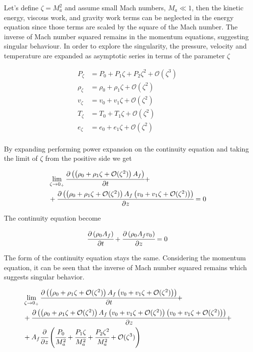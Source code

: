 \documentclass[../Article_Model_Parameters.tex]{subfiles}
\begin{document}
	Let's define $\zeta=M_a^2$ and assume small Mach numbers, $M_a \ll 1$, then the kinetic energy, viscous work, and gravity work terms can be neglected in the energy equation since those terms are scaled by the square of the Mach number. The inverse of Mach number squared remains in the momentum equations, suggesting singular behaviour. In order to explore the singularity, the pressure, velocity and temperature are expanded as asymptotic series in terms of the parameter $\zeta$
	
	{\footnotesize
		\begin{align*}
			P_\zeta 	& = P_0 	+ P_1 \zeta		+ P_2 \zeta^2 		+ \mathcal{O}(\zeta^3) \\
			\rho_\zeta 	& = \rho_0	+ \rho_1 \zeta	+ \mathcal{O}(\zeta^2) \\
			v_\zeta 	& = v_0		+ v_1 \zeta 	+ \mathcal{O}(\zeta^2) \\
			T_\zeta 	& = T_0 	+ T_1 \zeta 	+ \mathcal{O}(\zeta^2) \\
			e_\zeta 	& = e_0 	+ e_1 \zeta 	+ \mathcal{O}(\zeta^2) \\
		\end{align*}
	}

	 By expanding performing power expansion on the continuity equation and taking the limit of $\zeta$ from the positive side we get
	 
	 {\footnotesize
	 	\begin{align*}
	 		& \lim_{\zeta \rightarrow 0_+} \cfrac{\partial \left( \left( \rho_0	+ \rho_1 \zeta	+ \mathcal{O}(\zeta^2) \right) A_f \right)}{\partial t} + \\
	 		&+ \cfrac{\partial \left(  \left(  \rho_0 + \rho_1 \zeta + \mathcal{O}(\zeta^2) \right) A_f \left( v_0	+v_1 \zeta 	+ \mathcal{O}(\zeta^2) \right) \right) }{\partial z} = 0
	 	\end{align*}
	 }
 
	The continuity equation become
	
		 {\footnotesize
		\begin{equation}
			\cfrac{\partial \left( \rho_0 A_f \right)}{\partial t} + \cfrac{\partial \left( \rho_0 A_f v_0 \right)}{\partial z} = 0
		\end{equation}
	}

	The form of the continuity equation stays the same. Considering the momentum equation, it can be seen that the inverse of Mach number squared remains which suggests singular behavior. 
	
	{\footnotesize
		\begin{align*}
		 & \lim_{\zeta \rightarrow 0_+} \cfrac{\partial \left(  \left(  \rho_0 + \rho_1 \zeta + \mathcal{O}(\zeta^2) \right) A_f \left( v_0	+v_1 \zeta 	+ \mathcal{O}(\zeta^2) \right) \right) }{\partial t} + \\
		 &+ \cfrac{\partial \left(  \left(  \rho_0	+ \rho_1 \zeta	+ \mathcal{O}(\zeta^2) \right) A_f \left( v_0	+ v_1 \zeta 	+ \mathcal{O}(\zeta^2) \right) \left( v_0	+ v_1 \zeta + \mathcal{O}(\zeta^2) \right) \right) }{\partial z} + \\
		 &+ A_f \cfrac{\partial }{\partial z} \left(  \cfrac{P_0}{M_a^2}	+ \cfrac{P_1 \zeta}{M_a^2}	+ \cfrac{P_2 \zeta^2}{M_a^2} + \mathcal{O}(\zeta^3) \right)
		\end{align*}
	}
\end{document}
